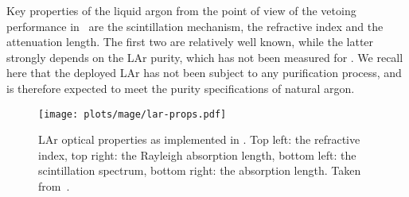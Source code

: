 Key properties of the liquid argon from the point of view of the vetoing performance in
\gerda\ are the scintillation mechanism, the refractive index and the attenuation length.
The first two are relatively well known, while the latter strongly depends on the LAr
purity, which has not been measured for \gerda. We recall here that the deployed LAr has
not been subject to any purification process, and is therefore expected to meet the purity
specifications of natural argon.

\begin{figure}
  \centering
  \texttt{[image: plots/mage/lar-props.pdf]}
  \caption{%
    LAr optical properties as implemented in \mage. Top left: the refractive index, top
    right: the Rayleigh absorption length, bottom left: the scintillation spectrum, bottom
    right: the absorption length. Taken from~\cite{Bideau-Mehu1981, Seidel2002,
    Heindl2010}.
  }\label{fig:bkg:lar:ph2:mage:lar-props}
\end{figure}

